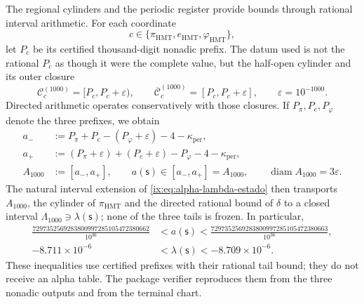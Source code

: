 The regional cylinders and the periodic register provide bounds through
rational interval arithmetic. For each coordinate
\[
 c\in\{\pi_{\mathrm{HMT}},e_{\mathrm{HMT}},\varphi_{\mathrm{HMT}}\},
\]
let \(P_c\) be its certified thousand-digit nonadic prefix. The datum used
is not the rational \(P_c\) as though it were the complete value, but the half-open
cylinder and its outer closure
\[
 \mathcal C_c^{(1000)}=[P_c,P_c+\varepsilon),
 \qquad
 \overline{\mathcal C}_c^{(1000)}=[P_c,P_c+\varepsilon],
 \qquad \varepsilon=10^{-1000}.
\]
Directed arithmetic operates conservatively with those closures. If
\(P_\pi,P_e,P_\varphi\) denote the three prefixes, we obtain
\begin{equation}
\begin{aligned}
 a_-&:=P_\pi+P_e-(P_\varphi+\varepsilon)-4-
       \kappa_{\mathrm{per}},\\
 a_+&:=(P_\pi+\varepsilon)+(P_e+\varepsilon)-P_\varphi-4-
       \kappa_{\mathrm{per}},\\
 A_{1000}&:=[a_-,a_+],
 \qquad a(\mathsf s)\in[a_-,a_+]=A_{1000},
 \qquad \operatorname{diam}A_{1000}=3\varepsilon.
\end{aligned}
\label{ix:eq:alpha-propagacion-colas-rev08}
\end{equation}
The natural interval extension of
\eqref{ix:eq:alpha-lambda-estado} then transports \(A_{1000}\), the cylinder
of \(\pi_{\mathrm{HMT}}\) and the directed rational bound of \(\delta\) to a
closed interval \(\Lambda_{1000}\ni\lambda(\mathsf s)\); none of the
three tails is frozen. In particular,
\begin{equation}
\begin{aligned}
 \frac{7297352569283800997285105472380662}{10^{36}}
 &<a(\mathsf s)<
 \frac{7297352569283800997285105472380663}{10^{36}},\\
 -8.711\mathbin{\times}10^{-6}
 &<\lambda(\mathsf s)<-8.709\mathbin{\times}10^{-6}.
\end{aligned}
 \label{ix:eq:alpha-cotas-precoordenada-lambda}
\end{equation}
These inequalities use certified prefixes with their rational tail
bound; they do not receive an alpha table. The package verifier reproduces them
from the three nonadic outputs and from the terminal chart.

